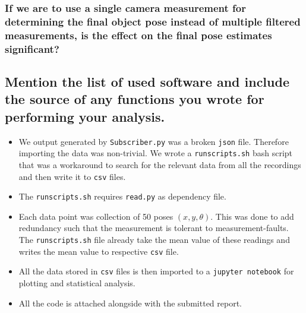 \subsubsection{If we are to use a single camera measurement for determining the final object pose instead of multiple filtered measurements, is the effect on the final pose estimates significant?}

\subsection{Mention the list of used software and include the source of any functions you wrote for performing your analysis.}
\begin{itemize}
\item We output generated by \texttt{Subscriber.py} was a broken \texttt{json} file. Therefore importing the data was non-trivial. We wrote a \texttt{runscripts.sh} bash script that was a workaround to search for the relevant data from all the recordings and then write it to \texttt{csv} files.
\item The \texttt{runscripts.sh} requires \texttt{read.py} as dependency file.
\item Each data point was collection of 50 poses $(x, y, \theta)$. This was done to add redundancy such that the measurement is tolerant to measurement-faults. The \texttt{runscripts.sh} file already take the mean value of these readings and writes the mean value to respective \texttt{csv} file.
\item All the data stored in \texttt{csv} files is then imported to a \texttt{jupyter notebook} for plotting and statistical analysis.
\item All the code is attached alongside with the submitted report.
\end{itemize}

